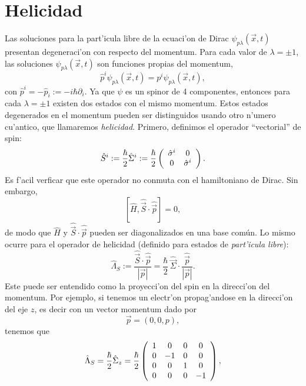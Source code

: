 \section{Helicidad}

Las soluciones para la part'icula libre de la ecuaci'on de Dirac
$\psi_{p\lambda}(\vec{x},t)$ presentan degeneraci'on con respecto del momentum.
Para cada valor de $\lambda=\pm 1$, las soluciones $\psi_{p\lambda}(\vec{x},t)$
son funciones propias del momentum, 
\begin{equation}
\hat{p}^i\psi_{p\lambda}(\vec{x},t) =p^i\psi_{p\lambda}(\vec{x},t),
\end{equation}
con $\hat{p}^i=-\hat{p}_i:=-i\hbar \partial_i$. Ya que $\psi$ es un spinor
de 4 componentes, entonces para cada $\lambda=\pm 1$ existen dos
estados con el mismo momentum. Estos estados degenerados en el momentum pueden
ser distinguidos usando otro n'umero cu'antico, que llamaremos
\textit{helicidad}. Primero, definimos el operador ``vectorial'' de spin:
\begin{equation}
\hat{S}^i:=\frac{\hbar}{2}\hat{\Sigma}^i:=\frac{\hbar}{2}\left(
\begin{array}
[c]{cc}%
\hat{\sigma}^i & 0\\
0 & \hat{\sigma}^i%
\end{array}
\right).
\end{equation}
Es f'acil verficar que este operador no conmuta con el hamiltoniano de Dirac.
Sin embargo, 
\begin{equation}
\left[ \hat{H},\hat{\vec{S}}\cdot\hat{\vec{p}}\right] =0,
\end{equation}
de modo que $\hat{H}$ y $\hat{\vec{S}}\cdot\hat{\vec{p}}$ pueden ser
diagonalizados en una base com\'{u}n. Lo mismo ocurre para el operador de
helicidad (definido para estados de \textit{part'icula libre}):
\begin{equation}
\hat{\Lambda}_{S}:=\frac{\hat{\vec{S}}\cdot\hat{\vec{p}}}{|\vec{p}|}=\frac{\hbar
}{2}\,\hat {\vec{\Sigma}}\cdot\frac{\hat{\vec{p}}}{|\vec{p}|}.
\end{equation}
Este puede ser entendido como la proyecci'on del spin en la direcci'on del
momentum. Por ejemplo, si tenemos un electr'on propag'andose en la direcci'on
del eje $z$, es decir con un vector momentum dado por
\begin{equation}
\vec{p}=\left( 0,0,p\right),
\end{equation}
tenemos que
\begin{equation}
\hat{\Lambda}_{S}=\frac{\hbar}{2}\hat{\Sigma}_{z}=\frac{\hbar}{2}\left(
\begin{array}
[c]{cccc}%
1 & 0 & 0 & 0\\
0 & -1 & 0 & 0\\
0 & 0 & 1 & 0\\
0 & 0 & 0 & -1
\end{array}
\right),
\end{equation}
